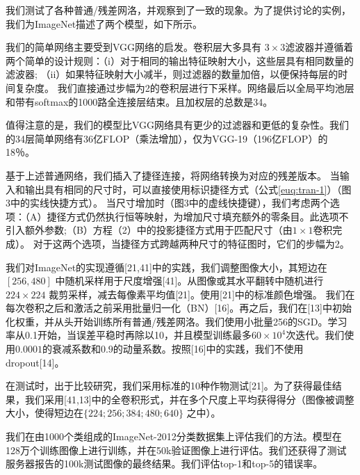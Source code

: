 
我们测试了各种普通/残差网洛，并观察到了一致的现象。为了提供讨论的实例，我们为ImageNet描述了两个模型，如下所示。


我们的简单网络主要受到VGG网络的启发。卷积层大多具有 $ 3\times3 $滤波器并遵循着两个简单的设计规则：（i）对于相同的输出特征映射大小，这些层具有相同数量的滤波器; （ii）如果特征映射大小减半，则过滤器的数量加倍，以便保持每层的时间复杂度。 我们直接通过步幅为2的卷积层进行下采样。网络最后以全局平均池层和带有softmax的1000路全连接层结束。且加权层的总数是34。

值得注意的是，我们的模型比VGG网络具有更少的过滤器和更低的复杂性。我们的34层简单网络有36亿FLOP（乘法增加），仅为VGG-19（196亿FLOP）的18％。


基于上述普通网络，我们插入了捷径连接，将网络转换为对应的残差版本。 当输入和输出具有相同的尺寸时，可以直接使用标识捷径方式（公式\ref{euq:tran-1}）（图3中的实线快捷方式）。 当尺寸增加时（图3中的虚线快捷键），我们考虑两个选项：（A）捷径方式仍然执行恒等映射，为增加尺寸填充额外的零条目。此选项不引入额外参数;（B）方程（2）中的投影捷径方式用于匹配尺寸（由$1\times1$卷积完成）。 对于这两个选项，当捷径方式跨越两种尺寸的特征图时，它们的步幅为2。


我们对ImageNet的实现遵循[21,41]中的实践，我们调整图像大小，其短边在 $[256,480]$ 中随机采样用于尺度增强[41]。从图像或其水平翻转中随机进行 $224\times224$ 裁剪采样，减去每像素平均值[21]。使用[21]中的标准颜色增强。 我们在每次卷积之后和激活之前采用批量归一化（BN）[16]。再之后，我们在[13]中初始化权重，并从头开始训练所有普通/残差网洛。我们使用小批量256的SGD。学习率从0.1开始，当误差平稳时再除以10，并且模型训练最多$60\times10^4$次迭代。我们使用$0.0001$的衰减系数和$0.9$的动量系数。按照[16]中的实践，我们不使用dropout[14]。

在测试时，出于比较研究，我们采用标准的10种作物测试[21]。为了获得最佳结果，我们采用[41,13]中的全卷积形式，并在多个尺度上平均获得得分（图像被调整大小，使得短边在$\{224; 256; 384; 480; 640\}$ 之中）。



我们在由1000个类组成的ImageNet-2012分类数据集上评估我们的方法。模型在128万个训练图像上进行训练，并在50k验证图像上进行评估。我们还获得了测试服务器报告的100k测试图像的最终结果。我们评估top-1和top-5的错误率。

